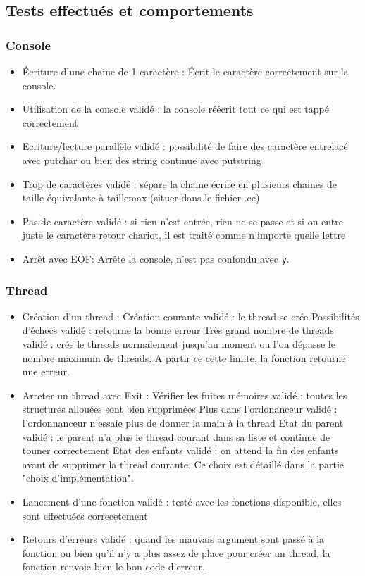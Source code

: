 \documentclass{article}
\begin{document}
	\subsection{Tests effectués et comportements}
		\subsubsection{Console}
			\begin{itemize}
				\item Écriture d'une chaine de 1 caractère : Écrit le caractère correctement sur la console.
				\item Utilisation de la console				validé : la console réécrit tout ce qui est tappé correctement
				\item Ecriture/lecture parallèle			validé : possibilité de faire des caractère entrelacé avec putchar ou bien des string continue avec putstring
				\item Trop de caractères					validé : sépare la chaine écrire en plusieurs chaines de taille équivalante à taillemax (situer dans le fichier .cc)
				\item Pas de caractère 						validé : si rien n'est entrée, rien ne se passe et si on entre juste le caractère retour chariot, il est traité comme n'importe quelle lettre
				\item Arrêt avec EOF: Arrête la console, n'est pas confondu avec \texttt{ÿ}.
			\end{itemize}

		\subsubsection{Thread}
			\begin{itemize}
				\item Création d'un thread :
					\subitem Création courante 				validé : le thread se crée
					\subitem Possibilités d'échecs	validé : retourne la bonne erreur
					\subitem Très grand nombre de threads 				validé : crée le threads normalement jusqu'au moment ou l'on dépasse le nombre maximum de threads. A partir ce cette limite, la fonction retourne une erreur.
				\item Arreter un thread avec Exit :
					\subitem Vérifier les fuites mémoires		validé : toutes les structures allouées sont bien supprimées
					\subitem Plus dans l'ordonanceur			validé : l'ordonnanceur n'essaie plus de donner la main à la thread
					\subitem Etat du parent					validé : le parent n'a plus le thread courant dans sa liste et continue de touner correctement
					\subitem Etat des enfants					validé : on attend la fin des enfants avant de supprimer la thread courante. Ce choix est détaillé dans la partie "choix d'implémentation".
				\item Lancement d'une fonction		validé : testé avec les fonctions disponible, elles sont effectuées correcetement
				\item Retours d'erreurs				validé : quand les mauvais argument sont passé à la fonction ou bien qu'il n'y a plus assez de place pour créer un thread, la fonction renvoie bien le bon code d'erreur.
			\end{itemize}
\end{document}
